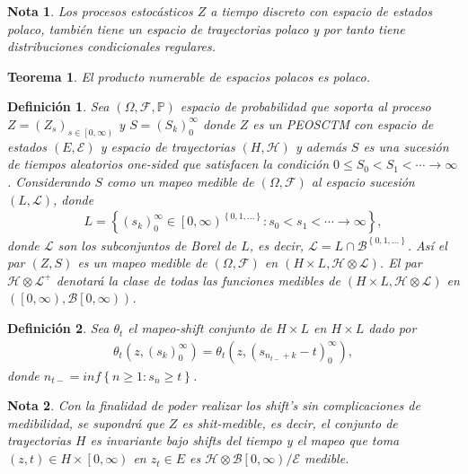 \documentclass{article}
\newtheorem{Def}{Definición}[section]
\newtheorem{Teo}{Teorema}%
\newtheorem{Note}{Nota}%
\newcommand{\prob}{\mathbb{P}}
\numberwithin{equation}{section}
\begin{document}
\begin{Note}
Los procesos estoc\'asticos $Z$ a tiempo discreto con espacio de estados polaco, tambi\'en tiene un espacio de trayectorias polaco y por tanto tiene distribuciones condicionales regulares.
\end{Note}

\begin{Teo}
El producto numerable de espacios polacos es polaco.
\end{Teo}


\begin{Def}
Sea $\left(\Omega,\mathcal{F},\prob\right)$ espacio de probabilidad que soporta al proceso $Z=\left(Z_{s}\right)_{s\in\left[0,\infty\right)}$ y $S=\left(S_{k}\right)_{0}^{\infty}$ donde $Z$ es un PEOSCTM con espacio de estados $\left(E,\mathcal{E}\right)$  y espacio de trayectorias $\left(H,\mathcal{H}\right)$  y adem\'as $S$ es una sucesi\'on de tiempos aleatorios one-sided que satisfacen la condici\'on $0\leq S_{0}<S_{1}<\cdots\rightarrow\infty$. Considerando $S$ como un mapeo medible de $\left(\Omega,\mathcal{F}\right)$ al espacio sucesi\'on $\left(L,\mathcal{L}\right)$, donde 
\begin{eqnarray}
L=\left\{\left(s_{k}\right)_{0}^{\infty}\in\left[0,\infty\right)^{\left\{0,1,\ldots\right\}}:s_{0}<s_{1}<\cdots\rightarrow\infty\right\},
\end{eqnarray}
donde $\mathcal{L}$ son los subconjuntos de Borel de $L$, es decir, $\mathcal{L}=L\cap\mathcal{B}^{\left\{0,1,\ldots\right\}}$. As\'i el par $\left(Z,S\right)$ es un mapeo medible de  $\left(\Omega,\mathcal{F}\right)$ en $\left(H\times L,\mathcal{H}\otimes\mathcal{L}\right)$. El par $\mathcal{H}\otimes\mathcal{L}^{+}$ denotar\'a la clase de todas las funciones medibles de $\left(H\times L,\mathcal{H}\otimes\mathcal{L}\right)$ en $\left(\left[0,\infty\right),\mathcal{B}\left[0,\infty\right)\right)$.
\end{Def}


\begin{Def}
Sea $\theta_{t}$ el mapeo-shift conjunto de $H\times L$ en $H\times L$ dado por
\begin{eqnarray}
\theta_{t}\left(z,\left(s_{k}\right)_{0}^{\infty}\right)=\theta_{t}\left(z,\left(s_{n_{t-}+k}-t\right)_{0}^{\infty}\right),
\end{eqnarray}
donde 
$n_{t-}=inf\left\{n\geq1:s_{n}\geq t\right\}$.
\end{Def}

\begin{Note}
Con la finalidad de poder realizar los shift's sin complicaciones de medibilidad, se supondr\'a que $Z$ es shit-medible, es decir, el conjunto de trayectorias $H$ es invariante bajo shifts del tiempo y el mapeo que toma $\left(z,t\right)\in H\times\left[0,\infty\right)$ en $z_{t}\in E$ es $\mathcal{H}\otimes\mathcal{B}\left[0,\infty\right)/\mathcal{E}$ medible.
\end{Note}
\end{document}
